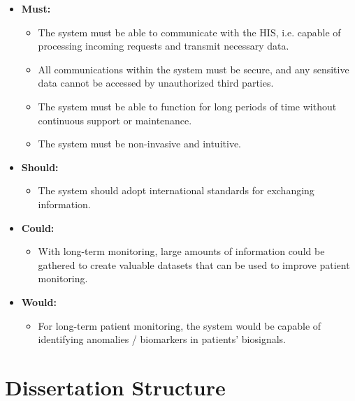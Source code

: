 


\begin{itemize}
    \item \textbf{Must:}
    \begin{itemize}
        \item The system must be able to communicate with the \acs{HIS}, i.e. capable of processing incoming requests and transmit necessary data.
        \item All communications within the system must be secure, and any sensitive data cannot be accessed by unauthorized third parties.
        \item The system must be able to function for long periods of time without continuous support or maintenance.
        \item The system must be non-invasive and intuitive.
    \end{itemize}
    \item \textbf{Should:}
    \begin{itemize}   
        \item The system should adopt international standards for exchanging information.
    \end{itemize}
    \item \textbf{Could:}
    \begin{itemize}   
        \item With long-term monitoring, large amounts of information could be gathered to create valuable datasets that can be used to improve patient monitoring.
    \end{itemize}
    \item \textbf{Would:}
    \begin{itemize}
        \item For long-term patient monitoring, the system would be capable of identifying anomalies / biomarkers in patients' biosignals.
    \end{itemize}
\end{itemize}

\section{Dissertation Structure}

